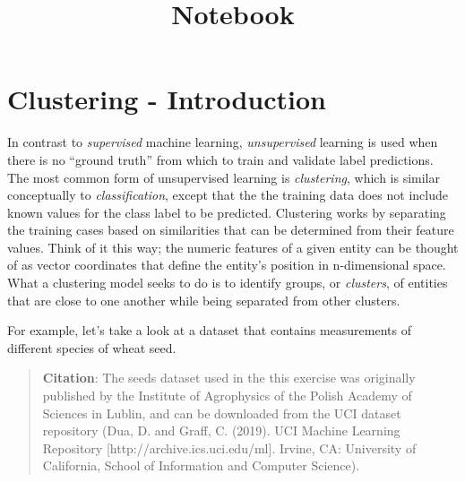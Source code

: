 \documentclass[11pt]{article}
\title{Notebook}
\begin{document}
    
    \maketitle
    
    

    
    \hypertarget{clustering---introduction}{%
\section{Clustering - Introduction}\label{clustering---introduction}}

In contrast to \emph{supervised} machine learning, \emph{unsupervised}
learning is used when there is no ``ground truth'' from which to train
and validate label predictions. The most common form of unsupervised
learning is \emph{clustering}, which is similar conceptually to
\emph{classification}, except that the the training data does not
include known values for the class label to be predicted. Clustering
works by separating the training cases based on similarities that can be
determined from their feature values. Think of it this way; the numeric
features of a given entity can be thought of as vector coordinates that
define the entity's position in n-dimensional space. What a clustering
model seeks to do is to identify groups, or \emph{clusters}, of entities
that are close to one another while being separated from other clusters.

For example, let's take a look at a dataset that contains measurements
of different species of wheat seed.

\begin{quote}
\textbf{Citation}: The seeds dataset used in the this exercise was
originally published by the Institute of Agrophysics of the Polish
Academy of Sciences in Lublin, and can be downloaded from the UCI
dataset repository (Dua, D. and Graff, C. (2019). UCI Machine Learning
Repository {[}http://archive.ics.uci.edu/ml{]}. Irvine, CA: University
of California, School of Information and Computer Science).
\end{quote}
\end{document}
